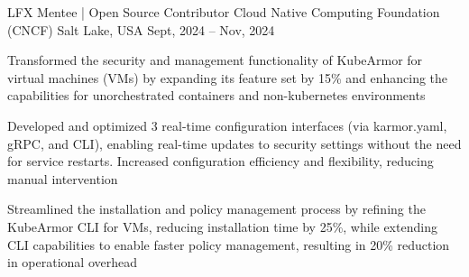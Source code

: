 \documentclass[]{awesome-cv}
\begin{document}
\begin{cventries}
{\begin{cvitems}
        \end{cvitems}}
    \vspace{-2mm}
    \cventry
    {LFX Mentee | Open Source Contributor}
    {Cloud Native Computing Foundation (CNCF)}
    {Salt Lake, USA}
    {Sept, 2024 – Nov, 2024}
    {\begin{cvitems}
        \item Transformed the security and management functionality of KubeArmor for virtual machines (VMs) by expanding its feature set by 15\% and enhancing the capabilities for unorchestrated containers and non-kubernetes environments
        \item Developed and optimized 3 real-time configuration interfaces (via karmor.yaml, gRPC, and CLI), enabling real-time updates to security settings without the need for service restarts. Increased configuration efficiency and flexibility, reducing manual intervention
        \item Streamlined the installation and policy management process by refining the KubeArmor CLI for VMs, reducing installation time by 25\%, while extending CLI capabilities to enable faster policy management, resulting in 20\% reduction in operational overhead
        \end{cvitems}}


\end{cventries}
\end{document}
